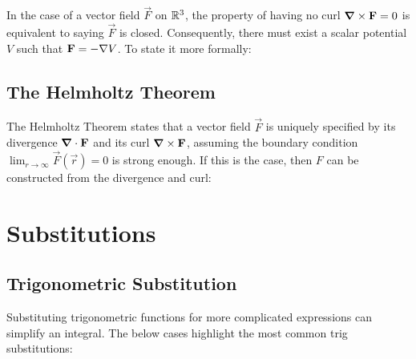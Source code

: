 In the case of a vector field $\vec{F}$ on $\mathbb{R}^{3}$, the property of having no curl $\boldsymbol{\mathbf{\nabla}} \times \boldsymbol{\mathbf{F}} = 0$ is equivalent to saying $\vec{F}$ is closed. Consequently, there must exist a scalar potential $V$ such that $\boldsymbol{\mathbf{F}} = -\nabla V$. To state it more formally:

\subsection{The Helmholtz Theorem}
The Helmholtz Theorem states that a vector field $\vec{F}$ is uniquely specified by its divergence $\boldsymbol{\mathbf{\nabla}}\cdot \boldsymbol{\mathbf{F}}$ and its curl $\boldsymbol{\mathbf{\nabla}}\times \boldsymbol{\mathbf{F}}$, assuming the boundary condition $\lim_{r\to \infty} \vec{F}(\vec{r})=0$ is strong enough. If this is the case, then $F$ can be constructed from the divergence and curl:


\section{Substitutions}
\subsection{Trigonometric Substitution}
Substituting trigonometric functions for more complicated expressions can simplify an integral. The below cases highlight the most common trig substitutions:

